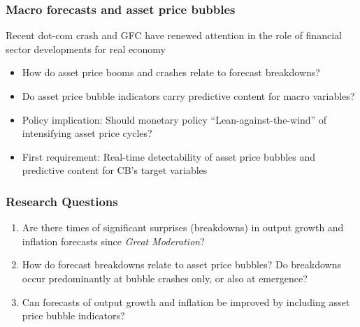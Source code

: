 \documentclass [handout] {beamer} %
\begin{document}
\begin{frame}
\frametitle{Macro forecasts and asset price bubbles}
Recent dot-com crash and GFC have renewed attention in the role of financial sector developments for real economy %
	\begin{itemize}
	\item How do asset price booms and crashes relate to forecast breakdowns?
	\item Do asset price bubble indicators carry predictive content for macro variables?
	\item Policy implication: Should monetary policy ``Lean-against-the-wind'' of intensifying asset price cycles?
	\item First requirement: Real-time detectability of asset price bubbles and predictive content for CB's target variables
	\end{itemize}
\end{frame}

\begin{frame}
\frametitle{Research Questions}
	\begin{enumerate}
	\item Are there times of significant surprises (breakdowns) in output growth and inflation forecasts since \emph{Great Moderation}?
	\item How do forecast breakdowns relate to asset price bubbles? Do breakdowns occur predominantly at bubble crashes only, or also at emergence?
	\item Can forecasts of output growth and inflation be improved by including asset price bubble indicators?	
	\end{enumerate}
\end{frame}
	
\end{document}
